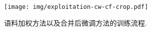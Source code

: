 \begin{figure}[hb]
    \centering
    \texttt{[image: img/exploitation-cw-cf-crop.pdf]}
    \caption{语料加权方法以及合并后微调方法的训练流程. }
    \label{fig:exploitation-approaches}
\end{figure}





